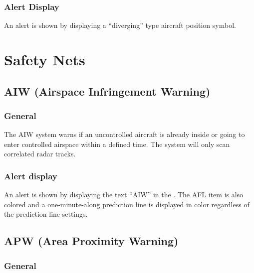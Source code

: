 \documentclass[a4paper,oneside,11pt]{memoir}
\begin{document}
\subsubsection*{Alert Display}

An alert is shown by displaying a “diverging” type aircraft position symbol.

\section{Safety Nets}



\subsection{AIW (Airspace Infringement Warning)}
\label{tool:AIW}
\subsubsection*{General}

The AIW system warns if an uncontrolled aircraft is already inside or going to enter controlled airspace within a defined time. The system will only scan correlated radar tracks.

\subsubsection*{Alert display}

An alert is shown by displaying the text “AIW” in the . The AFL item is also colored  and a one-minute-along prediction line is displayed in  color regardless of the prediction line settings.

\subsection{APW (Area Proximity Warning)}
\label{tool:APW}
\subsubsection*{General}
\end{document}
